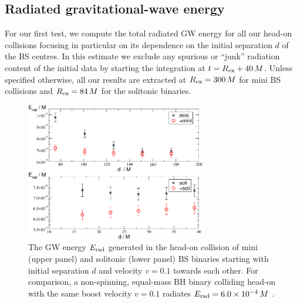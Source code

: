 \subsection{Radiated gravitational-wave energy}
%
For our first test, we compute the total radiated
GW energy for all our head-on collisions focusing
in particular on its dependence on the initial separation
$d$ of the BS centres. In this estimate we exclude
any spurious or ``junk'' radiation content
of the initial data by starting the integration
at $t=R_{\rm ex}+40\,M$. Unless specified otherwise,
all our results are extracted at $R_{\rm ex}=300\,M$ for
mini BS collisions and $R_{\rm ex}=84\,M$ for the
solitonic binaries.
%
\begin{figure}
    \centering
    \includegraphics[width=0.7\textwidth]{malaise_source/erad.pdf}
    \caption{The GW energy $E_{\rm rad}$ generated in
    the head-on collision of mini (upper panel) and solitonic (lower panel) BS binaries starting
    with initial separation $d$ and velocity $v=0.1$ towards
    each other.
    For comparison, a non-spinning, equal-mass BH binary
    colliding head-on with the same boost velocity $v=0.1$ radiates $E_{\rm rad}=6.0\times 10^{-4}\,M$
    \cite{Sperhake:2019oaw}.
    } 
    \label{mal:fig:erad}
\end{figure}
%


